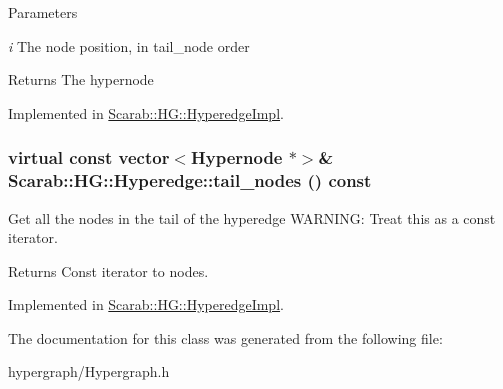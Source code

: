 \begin{DoxyParams}{Parameters}
\item[{\em i}]The node position, in tail\_\-node order\end{DoxyParams}
\begin{DoxyReturn}{Returns}
The hypernode 
\end{DoxyReturn}


Implemented in \hyperlink{classScarab_1_1HG_1_1HyperedgeImpl_a7087ba121f3056eb5946d1909c4b3d58}{Scarab::HG::HyperedgeImpl}.

\hypertarget{classScarab_1_1HG_1_1Hyperedge_abac6d27691186608aa12949de6e1c283}{
\subsubsection[{tail\_\-nodes}]{\setlength{\rightskip}{0pt plus 5cm}virtual const vector$<${\bf Hypernode} $\ast$$>$\& Scarab::HG::Hyperedge::tail\_\-nodes () const}}
\label{classScarab_1_1HG_1_1Hyperedge_abac6d27691186608aa12949de6e1c283}
Get all the nodes in the tail of the hyperedge WARNING: Treat this as a const iterator. \begin{DoxyReturn}{Returns}
Const iterator to nodes. 
\end{DoxyReturn}


Implemented in \hyperlink{classScarab_1_1HG_1_1HyperedgeImpl_a3bf00c8c032397150f59e196aea5e245}{Scarab::HG::HyperedgeImpl}.



The documentation for this class was generated from the following file:\begin{DoxyCompactItemize}
\item 
hypergraph/Hypergraph.h\end{DoxyCompactItemize}
